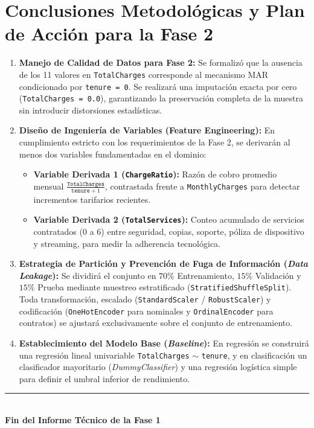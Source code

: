\documentclass[11pt,letterpaper]{article}
\begin{document}
\section{Conclusiones Metodológicas y Plan de Acción para la Fase 2}

\begin{enumerate}
    \item \textbf{Manejo de Calidad de Datos para Fase 2:} Se formalizó que la ausencia de los 11 valores en \texttt{TotalCharges} corresponde al mecanismo MAR condicionado por \texttt{tenure = 0}. Se realizará una imputación exacta por cero (\texttt{TotalCharges = 0.0}), garantizando la preservación completa de la muestra sin introducir distorsiones estadísticas.
    \item \textbf{Diseño de Ingeniería de Variables (Feature Engineering):} En cumplimiento estricto con los requerimientos de la Fase 2, se derivarán al menos dos variables fundamentadas en el dominio:
    \begin{itemize}
        \item \textbf{Variable Derivada 1 (\texttt{ChargeRatio}):} Razón de cobro promedio mensual $\frac{\texttt{TotalCharges}}{\texttt{tenure} + 1}$, contrastada frente a \texttt{MonthlyCharges} para detectar incrementos tarifarios recientes.
        \item \textbf{Variable Derivada 2 (\texttt{TotalServices}):} Conteo acumulado de servicios contratados ($0$ a $6$) entre seguridad, copias, soporte, póliza de dispositivo y streaming, para medir la adherencia tecnológica.
    \end{itemize}
    \item \textbf{Estrategia de Partición y Prevención de Fuga de Información (\textit{Data Leakage}):} Se dividirá el conjunto en $70\%$ Entrenamiento, $15\%$ Validación y $15\%$ Prueba mediante muestreo estratificado (\texttt{StratifiedShuffleSplit}). Toda transformación, escalado (\texttt{StandardScaler} / \texttt{RobustScaler}) y codificación (\texttt{OneHotEncoder} para nominales y \texttt{OrdinalEncoder} para contratos) se ajustará exclusivamente sobre el conjunto de entrenamiento.
    \item \textbf{Establecimiento del Modelo Base (\textit{Baseline}):} En regresión se construirá una regresión lineal univariable \texttt{TotalCharges} $\sim$ \texttt{tenure}, y en clasificación un clasificador mayoritario (\textit{DummyClassifier}) y una regresión logística simple para definir el umbral inferior de rendimiento.
\end{enumerate}

\vspace{0.8cm}
\begin{center}
    \rule{0.6\linewidth}{0.6pt}\\
    \small \textbf{Fin del Informe Técnico de la Fase 1}
\end{center}
\end{document}
